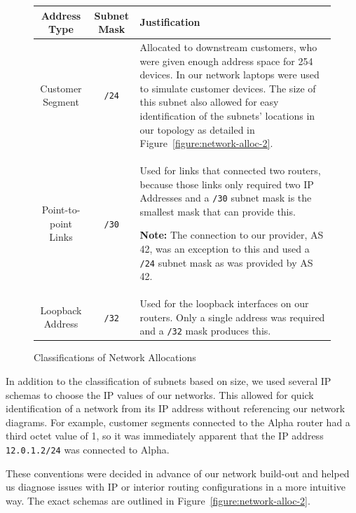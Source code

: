 \begin{figure}[!ht]
    \caption{Classifications of Network Allocations}
    \label{figure:network-alloc-1}
    \centering
    \begin{tabular}{|c|c|p{5.5cm}|}

        \hline
        \textbf{Address Type} & \textbf{Subnet Mask} & \textbf{Justification} \\

        \hline
        Customer Segment & \texttt{/24} & Allocated to downstream customers,
        who were given enough address space for 254 devices. In our network
        laptops were used to simulate customer devices. The size of this subnet
        also allowed for easy identification of the subnets' locations in our
        topology as detailed in Figure~\ref{figure:network-alloc-2}.\\

        \hline
        Point-to-point Links & \texttt{/30} & Used for links that connected two
        routers, because those links only required two IP Addresses and a
        \texttt{/30} subnet mask is the smallest mask that can provide this.

        \textbf{Note:} The connection to our provider, AS 42, was an exception
        to this and used a \texttt{/24} subnet mask as was provided by AS 42.\\

        \hline
        Loopback Address & \texttt{/32} & Used for the loopback interfaces on
        our routers. Only a single address was required and a \texttt{/32} mask
        produces this.\\

        \hline
    \end{tabular}
\end{figure}
In addition to the classification of subnets based on size, we used several IP
schemas to choose the IP values of our networks. This allowed for quick
identification of a network from its IP address without referencing our network
diagrams. For example, customer segments connected to the Alpha router had a
third octet value of 1, so it was immediately apparent that the IP address
\texttt{12.0.1.2/24} was connected to Alpha.

These conventions were decided in advance of our network build-out and helped
us diagnose issues with IP or interior routing configurations in a more
intuitive way. The exact schemas are outlined in Figure~\ref{figure:network-alloc-2}.

